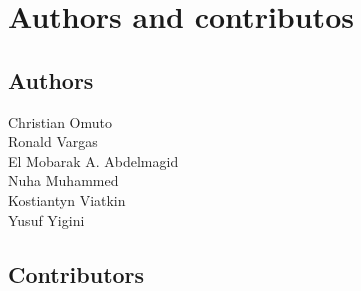 \documentclass[
  10pt,
  b5paper,
]{book}
\begin{document}
\mainmatter
\pagestyle{fancy}

\frontmatter
{}   
\tableofcontents
\listoffigures
\listoftables
\printnomenclature

\hypertarget{authors-and-contributos}{%
\chapter*{Authors and contributos}\label{authors-and-contributos}}

\hypertarget{authors}{%
\section*{Authors}\label{authors}}

Christian Omuto\\
Ronald Vargas\\
El Mobarak A. Abdelmagid\\
Nuha Muhammed\\
Kostiantyn Viatkin\\
Yusuf Yigini

\vfill

\hypertarget{contributors}{%
\section*{Contributors}\label{contributors}}
\end{document}
